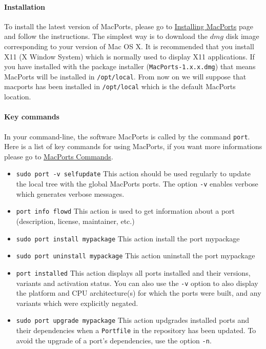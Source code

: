 \paragraph{Installation}
To install the latest version of MacPorts, please go to \href{http://www.macports.org/install.php}{Installing MacPorts} page and follow the instructions. The simplest way is to download the $dmg$ disk image corresponding to your version of Mac OS X. It is recommended that you install X11 (X Window System) which is normally used to display X11 applications.%
\newline \newline
If you have installed with the package installer (\verb|MacPorts-1.x.x.dmg|) that means MacPorts will be installed in \verb|/opt/local|. From now on we will suppose that macports has been installed in \verb|/opt/local| which is the default MacPorts location. %

\paragraph{Key commands}
In your command-line, the software MacPorts is called by the command \verb|port|. 
Here is a list of key commands for using MacPorts, if you want more informations please go to \href{http://guide.macports.org/#using.port}{MacPorts Commands}.
\begin{itemize}
\item \verb|sudo port -v selfupdate| \newline
	This action should be used regularly to update the local tree with the global MacPorts ports. The option \verb|-v| enables verbose which generates verbose messages.
\item \verb|port info flowd| \newline
	This action is used to get information about a port (description, license, maintainer, etc.)
\item \verb|sudo port install mypackage| \newline
	This action install the port mypackage
\item \verb|sudo port uninstall mypackage| \newline
	This action uninstall the port mypackage
\item \verb|port installed| \newline
	This action displays all ports installed and their versions, variants and activation status. You can also use the \verb|-v| option to also display the platform and CPU architecture(s) for which the ports were built, and any variants which were explicitly negated.
\item \verb|sudo port upgrade mypackage| \newline
	This action updgrades installed ports and their dependencies when a \verb|Portfile| in the repository has been updated. To avoid the upgrade of a port's dependencies, use the option \verb|-n|.
\end{itemize}


